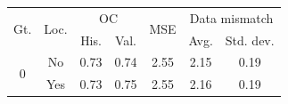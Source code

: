 \begin{tabular}{ccccccc}
\toprule
\multirow{2}{*}{
    Gt.
}
&
\multirow{2}{*}{Loc.} 
& 
\multicolumn{2}{c}{OC} & 
\multirow{2}{*}{
    MSE
} & 
\multicolumn{2}{c}{Data mismatch} 
\\
& & His. & Val. &  & Avg. & Std. dev.
\\
\midrule
\multirow{2}{*}{0} & No & 0.73 & 0.74 & 2.55 & 2.15 & 0.19 \\
 & Yes & 0.73 & 0.75 & 2.55 & 2.16 & 0.19 \\
\bottomrule
\end{tabular}

